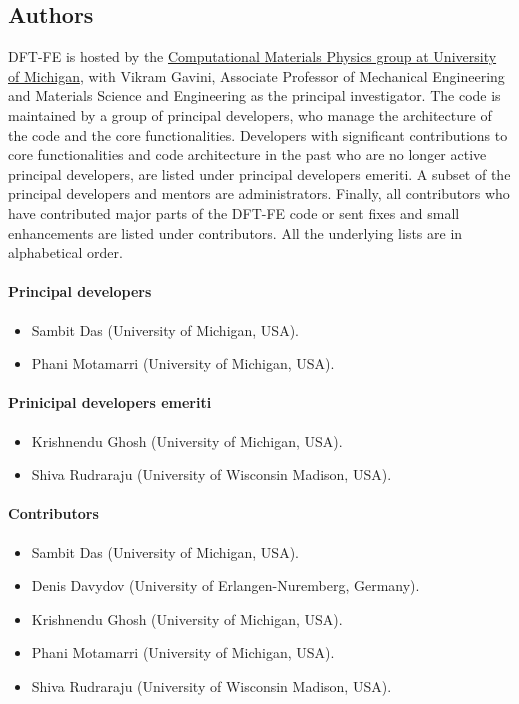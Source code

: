 \documentclass{article}
\newcommand{\dftfe}{\textsc{DFT-FE}}
\begin{document}
\subsection{Authors}
\label{sec:authors}
\dftfe{} is hosted by the \href{http://www-personal.umich.edu/~vikramg/}{Computational Materials Physics
group at University of Michigan}, with Vikram Gavini, Associate Professor of Mechanical Engineering and Materials Science and Engineering as
the principal investigator. The code is maintained by a group of principal developers, 
who manage the architecture of the code and the core functionalities. Developers with
significant contributions to core functionalities and code architecture in the past who are 
no longer active principal developers, are listed under principal developers emeriti. 
A subset of the principal developers and mentors are administrators. Finally, all contributors who have
contributed major parts of the DFT-FE code or sent fixes and small enhancements are listed
under contributors. All the underlying lists are in alphabetical order. 

\paragraph{Principal developers}
\begin{itemize}
	\item Sambit Das (University of Michigan, USA).
	\item Phani Motamarri (University of Michigan, USA).
\end{itemize}

\paragraph{Prinicipal developers emeriti}
\begin{itemize}
	\item Krishnendu Ghosh (University of Michigan, USA).
	\item Shiva Rudraraju (University of Wisconsin Madison, USA).	
\end{itemize}

\paragraph{Contributors}
\begin{itemize}
	\item Sambit Das (University of Michigan, USA).
	\item Denis Davydov (University of Erlangen-Nuremberg, Germany).
	\item Krishnendu Ghosh (University of Michigan, USA).
	\item Phani Motamarri (University of Michigan, USA).
	\item Shiva Rudraraju (University of Wisconsin Madison, USA).	
\end{itemize}
\end{document}
